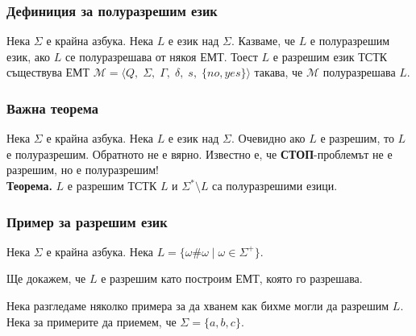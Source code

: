 \documentclass[14pt]{extarticle}
\begin{document}
\subsubsection*{Дефиниция за полуразрешим език}
Нека \(\Sigma\) е крайна азбука.
Нека \(L\) е език над \(\Sigma\).
Казваме, че \(L\) е полуразрешим език, ако \(L\) се полуразрешава от някоя ЕМТ.
Тоест \(L\) е разрешим език ТСТК съществува ЕМТ \(\mathcal M = \langle Q,\; \Sigma,\; \Gamma,\; \delta,\; s,\; \{no, yes\} \rangle\) такава, че \(\mathcal M\) полуразрешава \(L\).

\subsubsection*{Важна теорема}
Нека \(\Sigma\) е крайна азбука.
Нека \(L\) е език над \(\Sigma\).
Очевидно ако \(L\) е разрешим, то \(L\) е полуразрешим.
Обратното не е вярно. Известно е, че \textbf{СТОП}-проблемът не е разрешим, но е полуразрешим! \\

\textbf{Теорема.} \(L\) е разрешим ТСТК \(L\) и \(\Sigma^* \setminus L\) са полуразрешими езици.

\subsubsection*{Пример за разрешим език}
Нека \(\Sigma\) е крайна азбука.
Нека \(L = \{\omega\#\omega \mid \omega \in \Sigma^+\}\).

Ще докажем, че \(L\) е разрешим като построим ЕМТ, която го разрешава.

Нека разгледаме няколко примера за да хванем как бихме могли да разрешим \(L\).
Нека за примерите да приемем, че \(\Sigma = \{a, b, c\}\). \\
\end{document}
